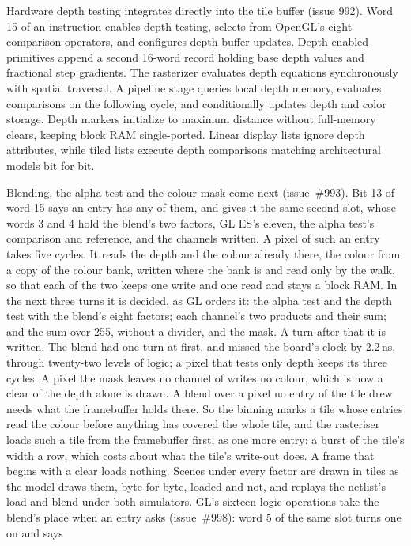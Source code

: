 \documentclass[journal,9pt]{IEEEtran}
\begin{document}
Hardware depth testing integrates directly into the tile buffer (issue 992).
Word 15 of an instruction enables depth testing, selects from OpenGL's eight
comparison operators, and configures depth buffer updates. Depth-enabled
primitives append a second 16-word record holding base depth values and
fractional step gradients. The rasterizer evaluates depth equations
synchronously with spatial traversal. A pipeline stage queries local depth
memory, evaluates comparisons on the following cycle, and conditionally
updates depth and color storage. Depth markers initialize to maximum distance
without full-memory clears, keeping block RAM single-ported. Linear display
lists ignore depth attributes, while tiled lists execute depth comparisons
matching architectural models bit for bit.

Blending, the alpha test and the colour mask come next
(issue~\#993). Bit 13 of word 15 says an entry has any of them, and
gives it the same second slot, whose words 3 and 4 hold the blend's two
factors, GL ES's eleven, the alpha test's comparison and reference, and
the channels written. A pixel of such an entry takes five cycles. It
reads the depth and the colour already there, the colour from a copy
of the colour bank, written where the bank is and read only by the
walk, so that each of the two keeps one write and one read and stays a
block RAM. In the next three turns it is decided, as GL orders it:
the alpha test and the depth test with the blend's eight factors; each
channel's two products and their sum; and the sum over 255, without a
divider, and the mask. A turn after that it is written. The blend had
one turn at first, and missed the board's clock by 2.2\,ns, through
twenty-two levels of logic; a pixel that tests only depth keeps its
three cycles. A pixel the mask leaves no channel of writes no colour, which
is how a clear of the depth alone is drawn. A blend over a pixel no
entry of the tile drew needs what the framebuffer holds there. So the
binning marks a tile whose entries read the colour before anything has
covered the whole tile, and the rasteriser loads such a tile from the
framebuffer first, as one more entry: a burst of the tile's width a
row, which costs about what the tile's write-out does. A frame that
begins with a clear loads nothing. Scenes under every factor are drawn
in tiles as the model draws them, byte for byte, loaded and not, and
 replays the netlist's load and blend under
both simulators.
GL's sixteen logic operations take the blend's place when an entry
asks (issue~\#998): word 5 of the same slot turns one on and says
\end{document}

